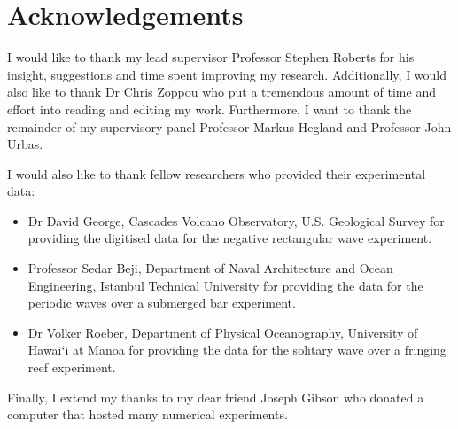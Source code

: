 
\chapter*{Acknowledgements}\label{acknowledgements}

I would like to thank my lead supervisor Professor Stephen Roberts for his insight, suggestions and time spent improving my research. Additionally, I would also like to thank Dr Chris Zoppou who put a tremendous amount of time and effort into reading and editing my work. Furthermore, I want to thank the remainder of my supervisory panel Professor Markus Hegland and Professor John Urbas.

I would also like to thank fellow researchers who provided their experimental data:
\begin{itemize}
	\item Dr David George, Cascades Volcano Observatory, U.S. Geological Survey for providing the digitised data for the negative rectangular wave experiment.
	\item Professor Sedar Beji, Department of Naval Architecture and Ocean Engineering, Istanbul Technical University for providing the data for the periodic waves over a submerged bar experiment.
	\item Dr Volker Roeber, Department of Physical Oceanography, University of Hawai`i at M\={a}noa for providing the data for the solitary wave over a fringing reef experiment.
\end{itemize}

Finally, I extend my thanks to my dear friend Joseph Gibson who donated a computer that hosted many numerical experiments. 
